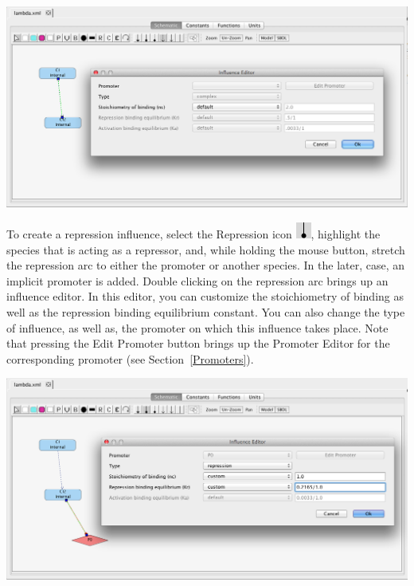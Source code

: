 \documentclass[titlepage,11pt]{article}
\begin{document}
\begin{center}
\includegraphics[width=160mm]{screenshots/complex} 
\end{center}

To create a repression influence, select the Repression icon 
\includegraphics{../gui/icons/modelview/inhibition_selected}, highlight the species that is acting as a repressor, and, while holding the mouse button, stretch the repression arc to either the promoter or another species.  In the later, case, an implicit promoter is added.  Double clicking on the repression arc brings up an influence editor.  In this editor, you can customize the stoichiometry of binding as well as the repression binding equilibrium constant.  You can also change the type of influence, as well as, the promoter on which this influence takes place.  Note that pressing the Edit Promoter button brings up the Promoter Editor for the corresponding promoter (see Section~\ref{Promoters}). 

\begin{center}
\includegraphics[width=160mm]{screenshots/repression} 
\end{center}
\end{document}
